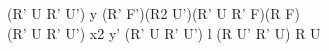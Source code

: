(R' U R' U') y (R' F')(R2 U')(R' U R' F)(R F)\\
(R' U R' U') x2 y' (R' U R' U') l (R U' R' U) R U\\
